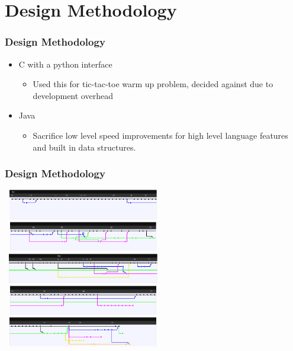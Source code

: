 \documentclass[10pt]{beamer}
\newcommand{\bcen}{\begin{center}}
\newcommand{\ecen}{\end{center}}
\begin{document}
\section{Design Methodology}

\begin{frame}
\frametitle{Design Methodology}
  \begin{itemize}
  \item<1-> C with a python interface
      \begin{itemize}
        \item<1-> Used this for tic-tac-toe warm up problem, decided against due to development overhead 
      \end{itemize}
  \item<2-> Java
      \begin{itemize}
        \item<2->  Sacrifice low level speed improvements for high level language features and built in data structures.
      \end{itemize}
  \end{itemize}
\end{frame}

\begin{frame}
\frametitle{Design Methodology}
  \bcen
  \includegraphics[height=1.3cm,width=7cm]{line1}\\
  \includegraphics[height=1.3cm,width=7cm]{line2}\\
  \includegraphics[height=1.3cm,width=7cm]{line3}\\
  \includegraphics[height=1.3cm,width=7cm]{line4}\\
  \includegraphics[height=1.3cm,width=7cm]{line5}
  \ecen
\end{frame}
\end{document}
